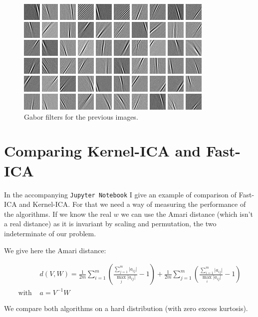 \documentclass[a4paper,BCOR=5mm,oneside,openany]{scrreprt}
\begin{document}
\begin{figure}[H]
	\centering
	\includegraphics[width=\textwidth]{images/basis}
	\caption{Gabor filters for the previous images.}
\end{figure}

\section{Comparing Kernel-ICA and Fast-ICA}

In the accompanying \texttt{Jupyter Notebook} I give an example of comparison of Fast-ICA and Kernel-ICA. For that we need a way of measuring the performance of the algorithms. If we know the real $w$ we can use the Amari distance (which isn't a real distance) as it is invariant by scaling and permutation, the two indeterminate of our problem.

We give here the Amari distance:

\begin{align*}
	&d(V,W) = \frac{1}{2 m} \sum_{i = 1}^m \left( \frac{\sum_{j = 1}^m \lvert a_{ij} \rvert}{\max_j \lvert a_{ij} \rvert} - 1 \right) + \frac{1}{2 m} \sum_{j = 1}^m \left( \frac{\sum_{i = 1}^m \lvert a_{ij} \rvert}{\max_i \lvert a_{ij} \rvert} - 1 \right) \\
	\text{with } &a = V^{-1} W
\end{align*}


We compare both algorithms on a hard distribution (with zero excess kurtosis).
\end{document}
